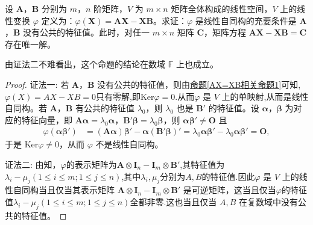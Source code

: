 \documentclass[../../main.tex]{subfiles}
\begin{document}
\begin{proposition}\label{proposition:AX-XB相关命题1}
设 \(\boldsymbol{A}\)，\(\boldsymbol{B}\) 分别为 \(m\)，\(n\) 阶矩阵，\(V\) 为 \(m\times n\) 矩阵全体构成的线性空间，\(V\) 上的线性变换 \(\varphi\) 定义为：\(\varphi(\boldsymbol{X}) = \boldsymbol{AX - XB}\)。求证：\(\varphi\) 是线性自同构的充要条件是 \(\boldsymbol{A}\)，\(\boldsymbol{B}\) 没有公共的特征值。此时，对任一 \(m\times n\) 矩阵 \(\boldsymbol{C}\)，矩阵方程 \(\boldsymbol{AX - XB = C}\) 存在唯一解。
\end{proposition}
\begin{remark}
由{\color{blue}证法二}不难看出，这个命题的结论在数域 $\mathbb{F}$ 上也成立。
\end{remark}
\begin{proof}
{\color{blue}证法一:}
若 \(\boldsymbol{A}\)，\(\boldsymbol{B}\) 没有公共的特征值，则由\hyperref[AX=XB相关命题1]{命题\ref{AX=XB相关命题1}}可知,$\varphi(X)=AX-XB=0$只有零解,即$\mathrm{Ker}\varphi= 0$.从而\(\varphi\) 是 \(V\) 上的单映射,从而是线性自同构。若 \(\boldsymbol{A}\)，\(\boldsymbol{B}\) 有公共的特征值 \(\lambda_0\)，则 \(\lambda_0\) 也是 \(\boldsymbol{B}'\) 的特征值。设 \(\boldsymbol{\alpha}\)，\(\boldsymbol{\beta}\) 为对应的特征向量，即 \(\boldsymbol{A\alpha}=\lambda_0\boldsymbol{\alpha}\)，\(\boldsymbol{B}'\boldsymbol{\beta}=\lambda_0\boldsymbol{\beta}\)，则 \(\boldsymbol{\alpha\beta}'\neq\boldsymbol{O}\) 且
\begin{align*}
\varphi(\boldsymbol{\alpha\beta}')&=(\boldsymbol{A\alpha})\boldsymbol{\beta}' - \boldsymbol{\alpha}(\boldsymbol{B}'\boldsymbol{\beta})'=\lambda_0\boldsymbol{\alpha\beta}' - \lambda_0\boldsymbol{\alpha\beta}'=\boldsymbol{O},
\end{align*}
于是 \(\mathrm{Ker}\varphi\neq 0\)，从而 \(\varphi\) 不是线性自同构。

{\color{blue}证法二:}
由知，$\varphi$的表示矩阵为$\boldsymbol{A} \otimes \boldsymbol{I}_n - \boldsymbol{I}_m \otimes \boldsymbol{B}'$,其特征值为$\lambda_i - \mu_j (1 \leqslant  i \leqslant  m; 1 \leqslant  j \leqslant  n)$,其中$\lambda_i,\mu_j$分别为$A,B$的特征值.因此$\varphi$ 是 $V$ 上的线性自同构当且仅当其表示矩阵 $\boldsymbol{A} \otimes \boldsymbol{I}_n - \boldsymbol{I}_m \otimes \boldsymbol{B}'$ 是可逆矩阵，这当且仅当$\varphi$的特征值$\lambda_i - \mu_j (1 \leqslant  i \leqslant  m; 1 \leqslant  j \leqslant  n)$全都非零.这也当且仅当 $A,B$ 在复数域中没有公共的特征值。
\end{proof}
\end{document}
